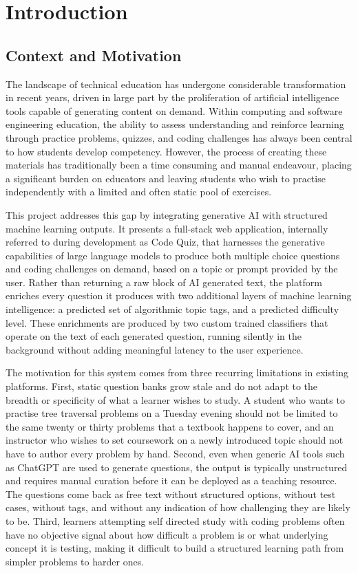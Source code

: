 \chapter{Introduction}

\section{Context and Motivation}

The landscape of technical education has undergone considerable transformation in recent years, driven in large part by the proliferation of artificial intelligence tools capable of generating content on demand. Within computing and software engineering education, the ability to assess understanding and reinforce learning through practice problems, quizzes, and coding challenges has always been central to how students develop competency. However, the process of creating these materials has traditionally been a time consuming and manual endeavour, placing a significant burden on educators and leaving students who wish to practise independently with a limited and often static pool of exercises.

This project addresses this gap by integrating generative AI with structured machine learning outputs. It presents a full-stack web
application, internally referred to during development as Code Quiz, that harnesses the generative capabilities of large language
models \cite{brown2020gpt3} to produce both multiple choice questions and
coding challenges on demand, based on a topic or prompt provided by the user. Rather than returning a raw block of AI generated text, the platform enriches every question it produces with two additional layers of machine learning intelligence: a predicted set of algorithmic topic tags, and a predicted difficulty level. These enrichments are produced by two custom trained classifiers that operate on the text of each generated question, running silently in the background without adding meaningful latency to the user experience.

The motivation for this system comes from three recurring limitations in existing platforms. First, static question banks grow stale and do
not adapt to the breadth or specificity of what a learner wishes to study. A student who wants to practise tree traversal problems on a Tuesday evening should not be limited to the same twenty or thirty problems that a textbook happens to cover, and an instructor who wishes to set coursework on a newly introduced topic should not have to author every problem by hand. Second, even when generic AI tools such as ChatGPT are used to generate questions, the output is typically unstructured and requires manual curation before it can be deployed as a teaching resource. The questions come back as free text without structured options, without test cases, without tags, and without any
indication of how challenging they are likely to be. Third, learners
attempting self directed study with coding problems often have no objective signal about how difficult a problem is or what underlying concept it is testing, making it difficult to build a structured learning path from simpler problems to harder ones.


